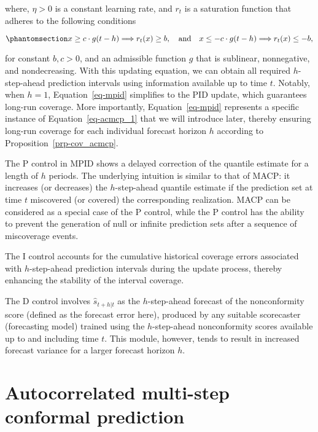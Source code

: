 \documentclass[
  11pt,
  a4paper,
]{article}
\theoremstyle{plain}
\theoremstyle{remark}
\begin{document}
where, \(\eta > 0\) is a constant learning rate, and \(r_t\) is a
saturation function that adheres to the following conditions

\begin{equation}\phantomsection\label{eq-saturation_h}{
x \geq c \cdot g(t-h) \Longrightarrow r_t(x) \geq b, \quad \text {and} \quad x \leq-c \cdot g(t-h) \Longrightarrow r_t(x) \leq -b,
}\end{equation}

for constant \(b, c > 0\), and an admissible function \(g\) that is
sublinear, nonnegative, and nondecreasing. With this updating equation,
we can obtain all required \(h\)-step-ahead prediction intervals using
information available up to time \(t\). Notably, when \(h=1\),
Equation~\ref{eq-mpid} simplifies to the PID update, which guarantees
long-run coverage. More importantly, Equation~\ref{eq-mpid} represents a
specific instance of Equation~\ref{eq-acmcp_1} that we will introduce
later, thereby ensuring long-run coverage for each individual forecast
horizon \(h\) according to Proposition~\ref{prp-cov_acmcp}.

The P control in MPID shows a delayed correction of the quantile
estimate for a length of \(h\) periods. The underlying intuition is
similar to that of MACP: it increases (or decreases) the
\(h\)-step-ahead quantile estimate if the prediction set at time \(t\)
miscovered (or covered) the corresponding realization. MACP can be
considered as a special case of the P control, while the P control has
the ability to prevent the generation of null or infinite prediction
sets after a sequence of miscoverage events.

The I control accounts for the cumulative historical coverage errors
associated with \(h\)-step-ahead prediction intervals during the update
process, thereby enhancing the stability of the interval coverage.

The D control involves \(\hat{s}_{t+h|t}\) as the \(h\)-step-ahead
forecast of the nonconformity score (defined as the forecast error
here), produced by any suitable scorecaster (forecasting model) trained
using the \(h\)-step-ahead nonconformity scores available up to and
including time \(t\). This module, however, tends to result in increased
forecast variance for a larger forecast horizon \(h\).

\section{Autocorrelated multi-step conformal
prediction}\label{sec-acmcp}
\end{document}
